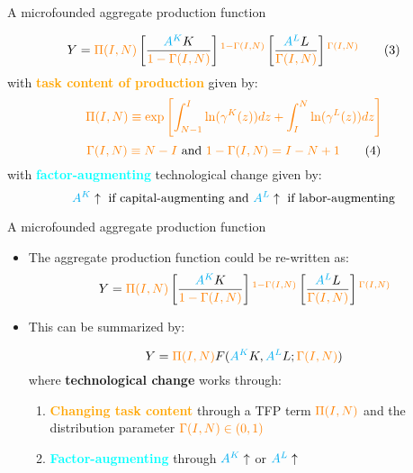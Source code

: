 \documentclass[notes=show]{beamer}
\begin{document}
\begin{frame}{A microfounded aggregate production function}
\begin{tcolorbox}
\[
Y = \color{orange} \Pi(I,N) \color{black} \left[ \frac{\color{cyan}A^{K} \color{black}K}{\color{orange}1-\Gamma(I,N)} \color{black}\right]^{\color{orange} 1-\Gamma(I,N)} \color{black} \left[ \frac{\color{cyan}A^{L} \color{black}L}{\color{orange}\Gamma(I,N)} \color{black} \right]^{\color{orange} \Gamma(I,N)} \tag{3} \label{eq3}
\]
with \textcolor{orange}{\textbf{task content of production}} given by:
\[
\color{orange} \Pi(I,N) \equiv \exp \left[ \int_{N-1}^{I} \ln(\gamma^{K}(z))dz + \int_{I}^{N} \ln(\gamma^{L}(z))dz \right] 
\]
\[
\color{orange} \Gamma(I,N) \equiv N-I \color{black} \text{ and } \color{orange} 1 - \Gamma(I,N)=I - N + 1 \color{black} \tag{4} \label{eq4}
\]
with \textcolor{cyan}{\textbf{factor-augmenting}} technological change given by:
\[
\color{cyan} A^{K} \color{black} \uparrow \text{ if capital-augmenting and } \color{cyan} A^{L} \color{black} \uparrow \text{ if labor-augmenting}
\]
\end{tcolorbox}
\end{frame}

\begin{frame}{A microfounded aggregate production function}
\begin{itemize}
\item The aggregate production function could be re-written as:
\[
Y = \color{orange} \Pi(I,N) \color{black} \left[ \frac{\color{cyan}A^{K} \color{black}K}{\color{orange}1-\Gamma(I,N)} \color{black}\right]^{\color{orange} 1-\Gamma(I,N)} \color{black} \left[ \frac{\color{cyan}A^{L} \color{black}L}{\color{orange}\Gamma(I,N)} \color{black} \right]^{\color{orange} \Gamma(I,N)} 
\]
\item This can be summarized by:
\begin{tcolorbox}
\[
Y = \color{orange} \Pi(I,N) \color{black}F(\color{cyan}A^{K} \color{black}K,\color{cyan}A^{L}\color{black}L; \color{orange}\Gamma(I,N) \color{black}) 
\]
where \textbf{technological change} works through:
\begin{enumerate}
\item \textcolor{orange}{\textbf{Changing task content}} through a TFP term $\color{orange}\Pi(I,N)$ and the distribution parameter $\color{orange}\Gamma(I,N) \in (0,1)$
\item \textcolor{cyan}{\textbf{Factor-augmenting}} through $\color{cyan} A^{K} \color{black} \uparrow$ or $\color{cyan} A^{L} \color{black} \uparrow$
\end{enumerate}
\end{tcolorbox}
\end{itemize}
\end{frame}
\end{document}
